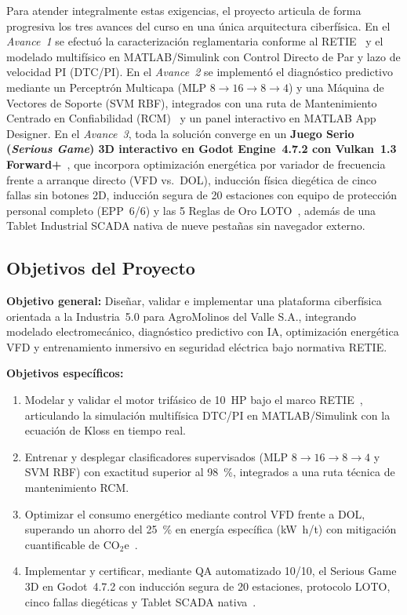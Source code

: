 Para atender integralmente estas exigencias, el proyecto articula de forma progresiva los tres avances del curso en una única arquitectura ciberfísica. En el \emph{Avance~1} se efectuó la caracterización reglamentaria conforme al RETIE~\cite{RETIE2024,RETIE2026} y el modelado multifísico en MATLAB/Simulink con Control Directo de Par y lazo de velocidad PI (DTC/PI). En el \emph{Avance~2} se implementó el diagnóstico predictivo mediante un Perceptrón Multicapa (MLP $8\to 16\to 8\to 4$) y una Máquina de Vectores de Soporte (SVM RBF), integrados con una ruta de Mantenimiento Centrado en Confiabilidad (RCM)~\cite{Moubray1997} y un panel interactivo en MATLAB App Designer. En el \emph{Avance~3}, toda la solución converge en un \textbf{Juego Serio (\textit{Serious Game}) 3D interactivo en Godot Engine~4.7.2 con Vulkan~1.3 Forward+}~\cite{Singh2023,Stefan2024}, que incorpora optimización energética por variador de frecuencia frente a arranque directo (VFD vs.\ DOL), inducción física diegética de cinco fallas sin botones 2D, inducción segura de 20 estaciones con equipo de protección personal completo (EPP~6/6) y las 5 Reglas de Oro LOTO~\cite{RETIE2026}, además de una Tablet Industrial SCADA nativa de nueve pestañas sin navegador externo.

\subsection{Objetivos del Proyecto}\label{subsec:objetivos}

\textbf{Objetivo general:} Diseñar, validar e implementar una plataforma ciberfísica orientada a la Industria~5.0 para AgroMolinos del Valle S.A., integrando modelado electromecánico, diagnóstico predictivo con IA, optimización energética VFD y entrenamiento inmersivo en seguridad eléctrica bajo normativa RETIE.

\textbf{Objetivos específicos:}
\begin{enumerate}\setlength{\itemsep}{2pt}\setlength{\topsep}{2pt}
\item Modelar y validar el motor trifásico de \qty{10}{HP} bajo el marco RETIE~\cite{RETIE2024,RETIE2026}, articulando la simulación multifísica DTC/PI en MATLAB/Simulink con la ecuación de Kloss en tiempo real.
\item Entrenar y desplegar clasificadores supervisados (MLP $8\to 16\to 8\to 4$ y SVM RBF) con exactitud superior al \qty{98}{\percent}, integrados a una ruta técnica de mantenimiento RCM.
\item Optimizar el consumo energético mediante control VFD frente a DOL, superando un ahorro del \qty{25}{\percent} en energía específica (\unit{\kilo\watt\hour/\tonne}) con mitigación cuantificable de $\text{CO}_2\text{e}$~\cite{UPME2024}.
\item Implementar y certificar, mediante QA automatizado 10/10, el Serious Game 3D en Godot~4.7.2 con inducción segura de 20 estaciones, protocolo LOTO, cinco fallas diegéticas y Tablet SCADA nativa~\cite{Stefan2024}.
\end{enumerate}
